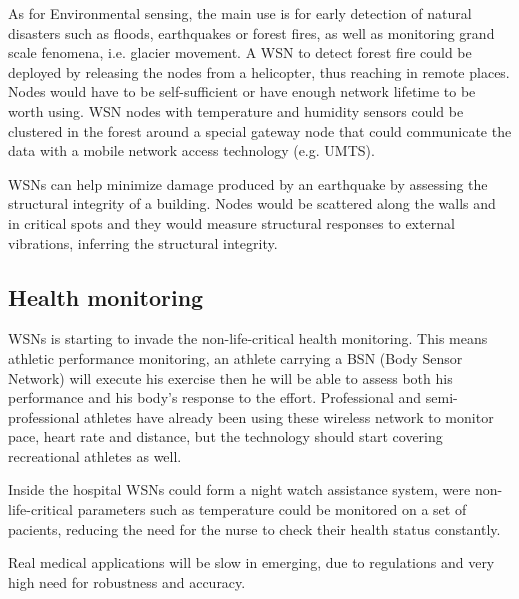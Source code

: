 As for Environmental sensing, the main use is for early detection of natural disasters such as floods, earthquakes or forest fires, as well as monitoring 
grand scale fenomena, i.e. glacier movement. A WSN to detect forest fire could be deployed by releasing the nodes from a helicopter, 
thus reaching in remote places. Nodes would have to be self-sufficient or have enough network lifetime to be worth using. WSN nodes with 
temperature and humidity sensors could be clustered in the forest around a special gateway node that could communicate the data with a 
mobile network access technology (e.g. UMTS). 

WSNs can help minimize damage produced by an earthquake by assessing the structural integrity of a building. Nodes would be scattered along the walls and in
critical spots and they would measure structural responses to external vibrations, inferring the structural integrity. 

\subsection{Health monitoring}

WSNs is  starting to invade the non-life-critical health monitoring. This means athletic performance monitoring, 
an athlete carrying a BSN (Body Sensor Network) will execute his exercise then he will be able to assess both his 
performance and his body's response to the effort. Professional and semi-professional athletes have already been using these
wireless network to monitor pace, heart rate and distance, but the technology should start covering recreational athletes as well. 

Inside the hospital WSNs could form a night watch assistance system, were non-life-critical parameters such as temperature could 
be monitored on a set of pacients, reducing the need for the nurse to check their health status constantly.

Real medical applications will be slow in emerging, due to regulations and very high need for robustness and accuracy.


